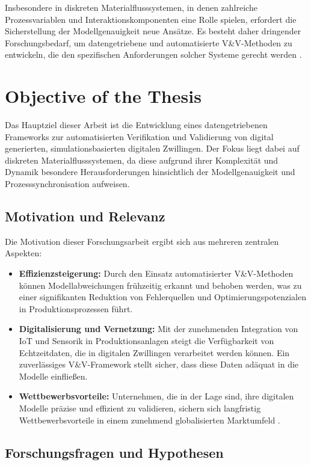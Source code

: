 Insbesondere in diskreten Materialflusssystemen, in denen zahlreiche Prozessvariablen und Interaktionskomponenten eine Rolle spielen, erfordert die Sicherstellung der Modellgenauigkeit neue Ansätze. Es besteht daher dringender Forschungsbedarf, um datengetriebene und automatisierte V\&V-Methoden zu entwickeln, die den spezifischen Anforderungen solcher Systeme gerecht werden \parencite{Kritzinger2018, Uhlemann2017}.

\section{Objective of the Thesis}

Das Hauptziel dieser Arbeit ist die Entwicklung eines datengetriebenen Frameworks zur automatisierten Verifikation und Validierung von digital generierten, simulationsbasierten digitalen Zwillingen. Der Fokus liegt dabei auf diskreten Materialflusssystemen, da diese aufgrund ihrer Komplexität und Dynamik besondere Herausforderungen hinsichtlich der Modellgenauigkeit und Prozesssynchronisation aufweisen.

\subsection*{Motivation und Relevanz}

Die Motivation dieser Forschungsarbeit ergibt sich aus mehreren zentralen Aspekten:
\begin{itemize}
  \item \textbf{Effizienzsteigerung:} Durch den Einsatz automatisierter V\&V-Methoden können Modellabweichungen frühzeitig erkannt und behoben werden, was zu einer signifikanten Reduktion von Fehlerquellen und Optimierungspotenzialen in Produktionsprozessen führt.
  \item \textbf{Digitalisierung und Vernetzung:} Mit der zunehmenden Integration von IoT und Sensorik in Produktionsanlagen steigt die Verfügbarkeit von Echtzeitdaten, die in digitalen Zwillingen verarbeitet werden können. Ein zuverlässiges V\&V-Framework stellt sicher, dass diese Daten adäquat in die Modelle einfließen.
  \item \textbf{Wettbewerbsvorteile:} Unternehmen, die in der Lage sind, ihre digitalen Modelle präzise und effizient zu validieren, sichern sich langfristig Wettbewerbsvorteile in einem zunehmend globalisierten Marktumfeld \parencite{Grieves2014}.
\end{itemize}

\subsection*{Forschungsfragen und Hypothesen}

